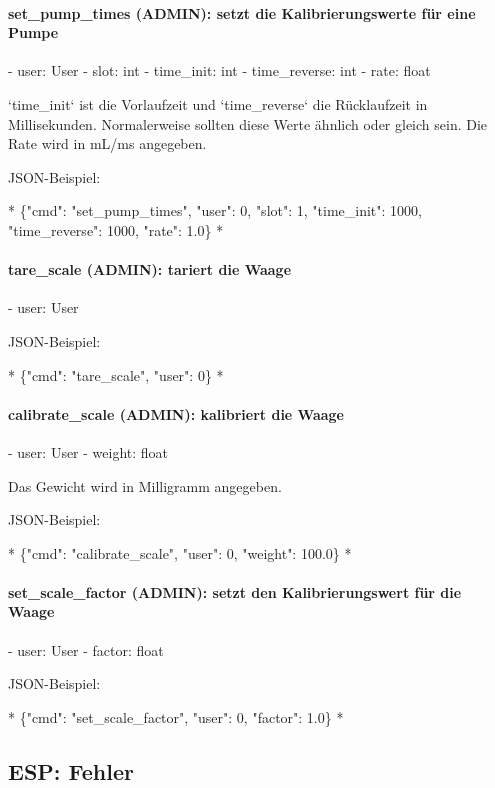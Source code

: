 \paragraph{set\_pump\_times (ADMIN): setzt die Kalibrierungswerte für eine Pumpe}

- user: User
- slot: int
- time\_init: int
- time\_reverse: int
- rate: float

`time\_init` ist die Vorlaufzeit und `time\_reverse` die Rücklaufzeit in Millisekunden. Normalerweise sollten diese Werte ähnlich oder gleich sein. Die Rate wird in mL/ms angegeben.

JSON-Beispiel:

*
\{"cmd": "set\_pump\_times", "user": 0, "slot": 1, "time\_init": 1000, "time\_reverse": 1000, "rate": 1.0\}
*

\paragraph{tare\_scale (ADMIN): tariert die Waage}

- user: User

JSON-Beispiel:

*
\{"cmd": "tare\_scale", "user": 0\}
*

\paragraph{calibrate\_scale (ADMIN): kalibriert die Waage}

- user: User
- weight: float

Das Gewicht wird in Milligramm angegeben.

JSON-Beispiel:

*
\{"cmd": "calibrate\_scale", "user": 0, "weight": 100.0\}
*

\paragraph{set\_scale\_factor (ADMIN): setzt den Kalibrierungswert für die Waage}

- user: User
- factor: float

JSON-Beispiel:

*
\{"cmd": "set\_scale\_factor", "user": 0, "factor": 1.0\}
*

\subsection{ESP: Fehler}
\label{sec:statuserror}

